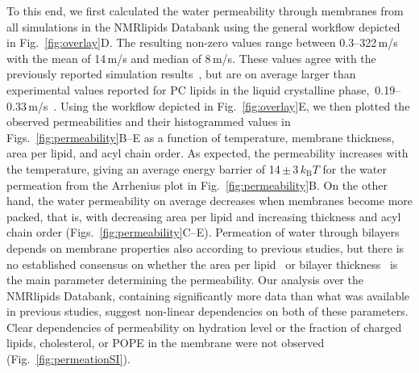 \documentclass[fleqn,10pt]{wlscirep}
\begin{document}
To this end, we first calculated the water permeability through membranes from all simulations in the NMRlipids Databank using the general workflow depicted in Fig.~\ref{fig:overlay}D. The resulting non-zero values range between 0.3--322\,\textmu{}m/s with the mean of 14\,\textmu{}m/s and median of 8\,\textmu{}m/s. These values agree with the previously reported simulation results~\cite{venable19,camilo2022}, but are on average larger than experimental values reported for PC lipids in the liquid crystalline phase,~0.19--0.33\,\textmu{}m/s~\cite{jansen95}. Using the workflow depicted in Fig.~\ref{fig:overlay}E, we then plotted the observed permeabilities and their histogrammed values in Figs.~\ref{fig:permeability}B--E as a function of temperature, membrane thickness, area per lipid, and acyl chain order. As expected, the permeability increases with the temperature, giving an average energy barrier of 14\,$\pm$\,3\,$k_\mathrm{B}T$ for the water permeation from the Arrhenius plot in Fig.~\ref{fig:permeability}B. On the other hand, the water permeability on average decreases when membranes become more packed, that is, with decreasing area per lipid and increasing thickness and acyl chain order (Figs.~\ref{fig:permeability}C--E). Permeation of water through bilayers depends on membrane properties also according to previous studies, but there is no established consensus on whether the area per lipid~\cite{nagle08} or bilayer thickness~\cite{frallicciardi22} is the main parameter determining the permeability. Our analysis over the NMRlipids Databank, containing significantly more data than what was available in previous studies, suggest non-linear dependencies on both of these parameters. Clear dependencies of permeability on hydration level or the fraction of charged lipids, cholesterol, or POPE in the membrane were not observed (Fig.~\ref{fig:permeationSI}).
%
\end{document}
